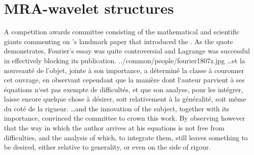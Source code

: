 \chapter{MRA-wavelet structures}\label{app:mrawav}

\qboxnpqt
  {
    A competition awards committee consisting of the mathematical and scientific giants \citeauthor*{mdf1812jan6} 
    commenting on \citeauthor{fourier1807}'s landmark \citeyear{fourier1807} paper
    \href{http://gallica.bnf.fr/ark:/12148/bpt6k33707/f220n7}{}
    that introduced the .
    As the quote demonstrates, Fourier's essay was quite controversial and Lagrange was 
    successful in effectively blocking its publication.\footnotemark  %
  }{../common/people/fourier1807z.jpg}
  { \ldots et la nouveaut\'e de l'objet, jointe \`a son importance, 
    a d\'etermin\'e la classe \`a couronner cet ouvrage, 
    en observant cependant que la mani\`ere dont l`auteur parvient 
    \`a ses \'equations n`est pas exempte de difficult\'es, et que son analyse, 
    pour les int\'egrer, laisse encore quelque chose \`a d\'esirer, 
    soit relativement \`a la g\'en\'eralit\'e, soit m\^eme du cot\'e de la rigueur.}
  { \ldots and the innovation of the subject, 
    together with its importance, 
    convinced the committee to crown this work.
    By observing however that the way in which the author arrives at his equations 
    is not free from difficulties, and the analysis of which, 
    to integrate them, still leaves something to be desired, 
    either relative to generality, or even on the side of rigour.}
